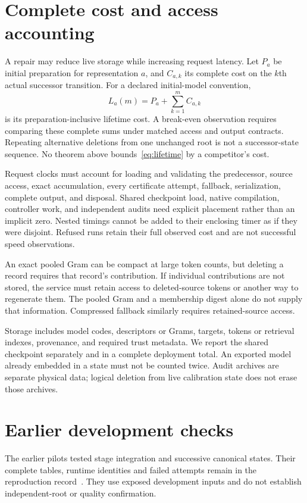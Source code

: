 \documentclass[10pt,twocolumn,letterpaper]{article}
\begin{document}
\section{Complete cost and access accounting}
A repair may reduce live storage while increasing request latency. Let $P_a$ be
initial preparation for representation $a$, and $C_{a,k}$ its complete cost on the
$k$th actual successor transition. For a declared initial-model convention,
\begin{equation}
 L_a(m)=P_a+\sum_{k=1}^{m}C_{a,k}
 \label{eq:lifetime}
\end{equation}
is its preparation-inclusive lifetime cost. A break-even observation requires
comparing these complete sums under matched access and output contracts. Repeating
alternative deletions from one unchanged root is not a successor-state sequence.
No theorem above bounds~\eqref{eq:lifetime} by a competitor's cost.

Request clocks must account for loading and validating the predecessor, source
access, exact accumulation, every certificate attempt, fallback, serialization,
complete output, and disposal. Shared checkpoint load, native compilation,
controller work, and independent audits need explicit placement rather than an
implicit zero. Nested timings cannot be added to their enclosing timer as if they
were disjoint. Refused runs retain their full observed cost and are not successful
speed observations.

An exact pooled Gram can be compact at large token counts, but deleting a record
requires that record's contribution. If individual contributions are not stored,
the service must retain access to deleted-source tokens or another way to
regenerate them. The pooled Gram and a membership digest alone do not supply that
information. Compressed fallback similarly requires retained-source access.

Storage includes model codes, descriptors or Grams, targets, tokens or retrieval
indexes, provenance, and required trust metadata. We report the shared checkpoint
separately and in a complete deployment total. An exported model already embedded
in a state must not be counted twice. Audit archives are separate physical data;
logical deletion from live calibration state does not erase those archives.

\section{Earlier development checks}
\label{sec:history}
The earlier pilots tested stage integration and successive canonical states.
Their complete tables, runtime identities and failed attempts remain in the
reproduction record~\cite{v39,v40,v43,v44,v47}. They use exposed development
inputs and do not establish independent-root or quality confirmation.
\end{document}
